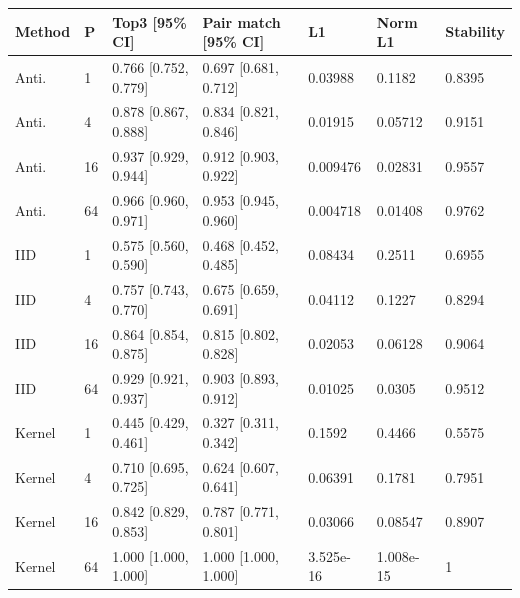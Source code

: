 \begingroup\footnotesize\setlength{\tabcolsep}{3pt}
\begin{tabular}{lllllll}
\toprule
Method & P & Top3 [95\% CI] & Pair match [95\% CI] & L1 & Norm L1 & Stability \\
\midrule
Anti. & 1 & 0.766 [0.752, 0.779] & 0.697 [0.681, 0.712] & 0.03988 & 0.1182 & 0.8395 \\
Anti. & 4 & 0.878 [0.867, 0.888] & 0.834 [0.821, 0.846] & 0.01915 & 0.05712 & 0.9151 \\
Anti. & 16 & 0.937 [0.929, 0.944] & 0.912 [0.903, 0.922] & 0.009476 & 0.02831 & 0.9557 \\
Anti. & 64 & 0.966 [0.960, 0.971] & 0.953 [0.945, 0.960] & 0.004718 & 0.01408 & 0.9762 \\
IID & 1 & 0.575 [0.560, 0.590] & 0.468 [0.452, 0.485] & 0.08434 & 0.2511 & 0.6955 \\
IID & 4 & 0.757 [0.743, 0.770] & 0.675 [0.659, 0.691] & 0.04112 & 0.1227 & 0.8294 \\
IID & 16 & 0.864 [0.854, 0.875] & 0.815 [0.802, 0.828] & 0.02053 & 0.06128 & 0.9064 \\
IID & 64 & 0.929 [0.921, 0.937] & 0.903 [0.893, 0.912] & 0.01025 & 0.0305 & 0.9512 \\
Kernel & 1 & 0.445 [0.429, 0.461] & 0.327 [0.311, 0.342] & 0.1592 & 0.4466 & 0.5575 \\
Kernel & 4 & 0.710 [0.695, 0.725] & 0.624 [0.607, 0.641] & 0.06391 & 0.1781 & 0.7951 \\
Kernel & 16 & 0.842 [0.829, 0.853] & 0.787 [0.771, 0.801] & 0.03066 & 0.08547 & 0.8907 \\
Kernel & 64 & 1.000 [1.000, 1.000] & 1.000 [1.000, 1.000] & 3.525e-16 & 1.008e-15 & 1 \\
\bottomrule
\end{tabular}

\endgroup
